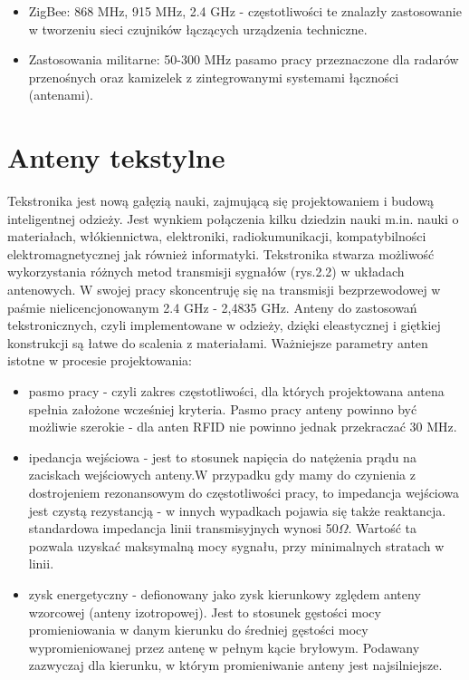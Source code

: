 \begin{itemize}
\begin{itemize}
\begin{itemize}
	\item ZigBee: 868 MHz, 915 MHz, 2.4 GHz - częstotliwości te znalazły zastosowanie w tworzeniu sieci czujników łączących urządzenia techniczne.

	\item Zastosowania militarne: 50-300 MHz pasamo pracy przeznaczone dla radarów przenośnych oraz kamizelek z zintegrowanymi systemami łączności (antenami).

\end{itemize}

\section{Anteny tekstylne}

Tekstronika jest nową gałęzią nauki, zajmującą się projektowaniem i budową inteligentnej odzieży. Jest wynkiem połączenia kilku dziedzin nauki m.in. nauki o materiałach, włókiennictwa, elektroniki, radiokumunikacji, kompatybilności elektromagnetycznej jak również informatyki. Tekstronika stwarza możliwość wykorzystania różnych metod transmisji sygnałów (rys.2.2) w układach antenowych. W swojej pracy skoncentruję się na transmisji bezprzewodowej w paśmie nielicencjonowanym 2.4 GHz - 2,4835 GHz.  
Anteny do zastosowań tekstronicznych, czyli implementowane w odzieży, dzięki eleastycznej i giętkiej konstrukcji są łatwe do scalenia z materiałami. 
Ważniejsze parametry anten istotne w procesie projektowania: 

\begin{itemize}\setlength{\itemsep}{0pt}

	\item pasmo pracy - czyli zakres częstotliwości, dla których projektowana antena spełnia założone wcześniej kryteria. Pasmo pracy anteny powinno być możliwie szerokie - dla anten RFID nie powinno jednak przekraczać 30 MHz. 

	\item ipedancja wejściowa - jest to stosunek napięcia do natężenia prądu na zaciskach wejściowych anteny.W przypadku gdy mamy do czynienia z dostrojeniem rezonansowym do częstotliwości pracy, to impedancja wejściowa jest czystą rezystancją - w innych wypadkach pojawia się także reaktancja.
	standardowa impedancja linii transmisyjnych wynosi 50\(\Omega\). Wartość ta pozwala uzyskać maksymalną mocy sygnału, przy minimalnych stratach w linii.

	\item zysk energetyczny - defionowany jako zysk kierunkowy zględem anteny wzorcowej (anteny izotropowej).
	Jest to stosunek gęstości mocy promieniowania w danym kierunku do średniej gęstości mocy wypromieniowanej przez antenę w pełnym kącie bryłowym. Podawany zazwyczaj dla kierunku, w którym promieniwanie anteny jest najsilniejsze.  


\end{itemize}
\end{itemize}
\end{itemize}
